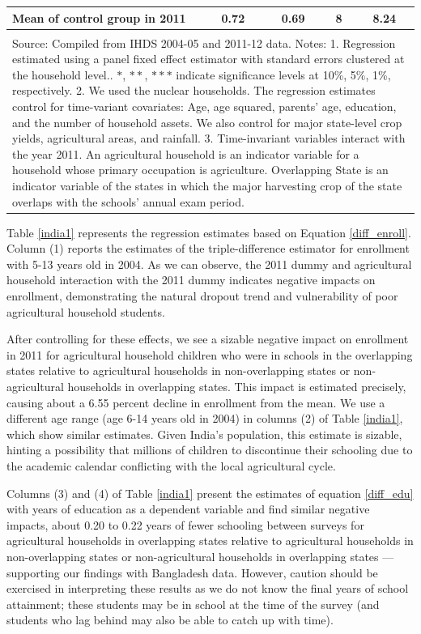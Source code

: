 \documentclass[12pt,letterpaper]{article}
\newcommand{\0}{\ensuremath{\mbox{\boldmath $0$}}}
\begin{document}
\begin{table}[h!]
\begin{center}
{{\begin{tabular}{lcccc}
Mean of control group in 2011          &       0.72 &       0.69 &          8 &       8.24 \\
\hline\\
\multicolumn{5}{p{20cm}}{{\footnotesize Source: Compiled from IHDS 2004-05 and 2011-12 data.
Notes: 1. Regression estimated using a panel fixed effect estimator with standard errors clustered at the household level.. $*$, $**$, $***$ indicate significance levels at 10\%, 5\%, 1\%, respectively.
2. We used the nuclear households. The regression estimates control for time-variant covariates: Age, age squared, parents' age, education, and the number of household assets. We also control for major state-level crop yields, agricultural areas, and rainfall. 
3. Time-invariant variables interact with the year 2011. An agricultural household is an indicator variable for a household whose primary occupation is agriculture. Overlapping State is an indicator variable of the states in which the major harvesting crop of the state overlaps with the schools' annual exam period. }}
\end{tabular}}}
\end{center}
\end{table}


Table \ref{india1} represents the regression estimates based on Equation \ref{diff_enroll}. Column (1) reports the estimates of the triple-difference estimator for enrollment with 5-13 years old in 2004. As we can observe, the 2011 dummy and agricultural household interaction with the 2011 dummy indicates negative impacts on enrollment, demonstrating the natural dropout trend and vulnerability of poor agricultural household students.

After controlling for these effects, we see a sizable negative impact on enrollment in 2011 for agricultural household children who were in schools in the overlapping states relative to agricultural households in non-overlapping states or non-agricultural households in overlapping states. This impact is estimated precisely, causing about a 6.55 percent decline in enrollment from the mean. We use a different age range (age 6-14 years old in 2004) in columns (2) of Table \ref{india1}, which show similar estimates. Given India's population, this estimate is sizable, hinting a possibility that millions of children to discontinue their schooling due to the academic calendar conflicting with the local agricultural cycle.  

Columns (3) and (4) of Table \ref{india1} present the estimates of equation \ref{diff_edu} with years of education as a dependent variable and find similar negative impacts, about 0.20 to 0.22 years of fewer schooling between surveys for agricultural households in overlapping states relative to agricultural households in non-overlapping states or non-agricultural households in overlapping states --- supporting our findings with Bangladesh data. However, caution should be exercised in interpreting these results as we do not know the final years of school attainment; these students may be in school at the time of the survey (and students who lag behind may also be able to catch up with time).
\end{document}
